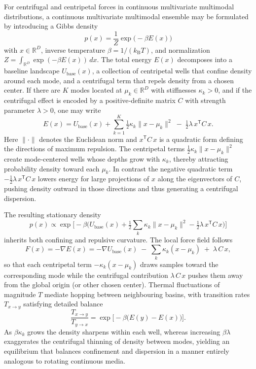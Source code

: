 \documentclass[11pt]{article}
\begin{document}
For centrifugal and centripetal forces in continuous multivariate multimodal distributions, a continuous multivariate multimodal ensemble may be formulated by introducing a Gibbs density
\[
p(x)=\frac{1}{Z}\exp\bigl(-\beta E(x)\bigr)
\]
with \(x\in\mathbb{R}^{D}\), inverse temperature \(\beta=1/(k_{\mathrm B}T)\), and normalization \(Z=\int_{\mathbb{R}^{D}}\exp(-\beta E(x))\,dx\).  The total energy \(E(x)\) decomposes into a baseline landscape \(U_{\mathrm{base}}(x)\), a collection of centripetal wells that confine density around each mode, and a centrifugal term that repels density from a chosen center.  If there are \(K\) modes located at \(\mu_{k}\in\mathbb{R}^{D}\) with stiffnesses \(\kappa_{k}>0\), and if the centrifugal effect is encoded by a positive‐definite matrix \(C\) with strength parameter \(\lambda>0\), one may write
\[
E(x)=U_{\mathrm{base}}(x)+\sum_{k=1}^{K}\tfrac12\kappa_{k}\|x-\mu_{k}\|^{2}\;-\;\tfrac12\lambda\,x^{\mathsf T}C\,x.
\]
Here \(\|\cdot\|\) denotes the Euclidean norm and \(x^{\mathsf T}C\,x\) is a quadratic form defining the directions of maximum repulsion.  The centripetal terms \(\tfrac12\kappa_{k}\|x-\mu_{k}\|^{2}\) create mode‐centered wells whose depths grow with \(\kappa_{k}\), thereby attracting probability density toward each \(\mu_{k}\).  In contrast the negative quadratic term \(-\tfrac12\lambda\,x^{\mathsf T}C\,x\) lowers energy for large projections of \(x\) along the eigenvectors of \(C\), pushing density outward in those directions and thus generating a centrifugal dispersion.

The resulting stationary density
\[
p(x)\propto\exp\bigl[-\beta\bigl(U_{\mathrm{base}}(x)+\tfrac12\sum_{k}\kappa_{k}\|x-\mu_{k}\|^{2}-\tfrac12\lambda\,x^{\mathsf T}C\,x\bigr)\bigr]
\]
inherits both confining and repulsive curvature.  The local force field follows
\[
F(x)=-\nabla E(x)=-\nabla U_{\mathrm{base}}(x)\;-\;\sum_{k}\kappa_{k}(x-\mu_{k})\;+\;\lambda\,C\,x,
\]
so that each centripetal term \(-\kappa_{k}(x-\mu_{k})\) draws samples toward the corresponding mode while the centrifugal contribution \(\lambda\,C\,x\) pushes them away from the global origin (or other chosen center).  Thermal fluctuations of magnitude \(T\) mediate hopping between neighbouring basins, with transition rates \(T_{x\to y}\) satisfying detailed balance
\[
\frac{T_{x\to y}}{T_{y\to x}}=\exp\bigl[-\beta\bigl(E(y)-E(x)\bigr)\bigr].
\]
As \(\beta\kappa_{k}\) grows the density sharpens within each well, whereas increasing \(\beta\lambda\) exaggerates the centrifugal thinning of density between modes, yielding an equilibrium that balances confinement and dispersion in a manner entirely analogous to rotating continuous media.
\end{document}

